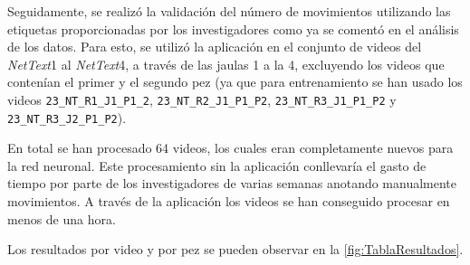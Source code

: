 Seguidamente, se realizó la validación del número de movimientos utilizando las etiquetas proporcionadas por los investigadores como ya se comentó en el análisis de los datos. Para esto, se utilizó la aplicación en el conjunto de 
videos del \textit{NetText}1 al \textit{NetText}4, a través de las jaulas 1 a la 4, excluyendo los videos que contenían el primer y el segundo pez (ya que para entrenamiento se han usado los videos \verb|23_NT_R1_J1_P1_2|, \verb|23_NT_R2_J1_P1_P2|, \verb|23_NT_R3_J1_P1_P2| 
y \verb|23_NT_R3_J2_P1_P2|).

En total se han procesado 64 videos, los cuales eran completamente nuevos para la red neuronal. Este procesamiento sin la aplicación conllevaría el gasto de tiempo por parte de los investigadores de varias semanas anotando manualmente movimientos. 
A través de la aplicación los videos se han conseguido procesar en menos de una hora.

Los resultados por video y por pez se pueden observar en la \autoref{fig:TablaResultados}.

